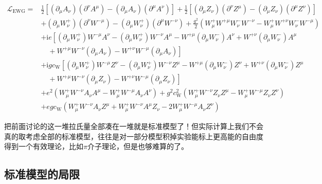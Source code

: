 \begin{equation}
	\begin{aligned}
		\mathcal{L}_{\mathrm{EWG}}= & \frac{1}{2}\left[\left(\partial_{\mu} A_{\nu}\right)\left(\partial^{\nu} A^{\mu}\right)-\left(\partial_{\mu} A_{\nu}\right)\left(\partial^{\mu} A^{\nu}\right)\right]+\frac{1}{2}\left[\left(\partial_{\mu} Z_{\nu}\right)\left(\partial^{\nu} Z^{\mu}\right)-\left(\partial_{\mu} Z_{\nu}\right)\left(\partial^{\mu} Z^{\nu}\right)\right] \\
		& +\left(\partial_{\mu} W_{\nu}^{+}\right)\left(\partial^{\nu} W^{-\mu}\right)-\left(\partial_{\mu} W_{\nu}^{+}\right)\left(\partial^{\mu} W^{-\nu}\right)+\frac{g^{2}}{2}\left(W_{\mu}^{+} W^{+\mu} W_{\nu}^{-} W^{-\nu}-W_{\mu}^{+} W^{+\nu} W_{\nu}^{-} W^{-\mu}\right) \\
		& +\mathrm{i} e\left[\left(\partial_{\mu} W_{\nu}^{+}\right) W^{-\mu} A^{\nu}-\left(\partial_{\mu} W_{\nu}^{+}\right) W^{-\nu} A^{\mu}-W^{+\mu}\left(\partial_{\mu} W_{\nu}^{-}\right) A^{\nu}+W^{+\nu}\left(\partial_{\mu} W_{\nu}^{-}\right) A^{\mu}\right. \\
		& \left.\quad+W^{+\mu} W^{-\nu}\left(\partial_{\mu} A_{\nu}\right)-W^{+\nu} W^{-\mu}\left(\partial_{\mu} A_{\nu}\right)\right] \\
		& +\mathrm{i} g c_{\mathrm{W}}\left[\left(\partial_{\mu} W_{\nu}^{+}\right) W^{-\mu} Z^{\nu}-\left(\partial_{\mu} W_{\nu}^{+}\right) W^{-\nu} Z^{\mu}-W^{+\mu}\left(\partial_{\mu} W_{\nu}^{-}\right) Z^{\nu}+W^{+\nu}\left(\partial_{\mu} W_{\nu}^{-}\right) Z^{\mu}\right. \\
		& \left.\quad+W^{+\mu} W^{-\nu}\left(\partial_{\mu} Z_{\nu}\right)-W^{+\nu} W^{-\mu}\left(\partial_{\mu} Z_{\nu}\right)\right] \\
		& +e^{2}\left(W_{\mu}^{+} W^{-\nu} A_{\nu} A^{\mu}-W_{\mu}^{+} W^{-\mu} A_{\nu} A^{\nu}\right)+g^{2} c_{\mathrm{W}}^{2}\left(W_{\mu}^{+} W^{-\nu} Z_{\nu} Z^{\mu}-W_{\mu}^{+} W^{-\mu} Z_{\nu} Z^{\nu}\right)\\
		&+egc_{\mathrm{W}}(W_{\mu}^{+}W^{-\nu}A_{\nu}Z^{\mu}+W_{\mu}^{+}W^{-\nu}A^{\mu}Z_{\nu}-2W_{\mu}^{+}W^{-\mu}A_{\nu}Z^{\nu})
	\end{aligned}
\end{equation}

把前面讨论的这一堆拉氏量全部凑在一堆就是标准模型了！但实际计算上我们不会真的取考虑全部的标准模型，往往是对一部分模型积掉实验能标上更高能的自由度得到一个有效理论，比如$\pi$介子理论，但是也够难算的了。
\subsection{标准模型的局限}

